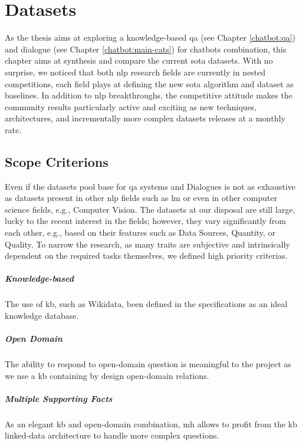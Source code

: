 \chapter{Datasets}
\label{chap:datasets}

As the thesis aims at exploring a knowledge-based \gls{qa} (see Chapter \ref{chatbot:qa}) and dialogue (see Chapter \ref{chatbot:main-cats}) for chatbots combination, this chapter aims at synthesis and compare the current \gls{sota} datasets. With no surprise, we noticed that both \gls{nlp} research fields are currently in nested competitions, each field plays at defining the new \gls{sota} algorithm and dataset as baselines. In addition to \gls{nlp} breakthroughs, the competitive attitude makes the community results particularly active and exciting as new techniques, architectures, and incrementally more complex datasets releases at a monthly rate.

\section{Scope Criterions}
\label{dataset:criterions}
Even if the datasets pool base for \gls{qa} systems and Dialogues is not as exhaustive as datasets present in other \gls{nlp} fields such as \gls{lm} or even in other computer science fields, e.g., Computer Vision. The datasets at our disposal are still large, lucky to the recent interest in the fields; however, they vary significantly from each other, e.g., based on their features such as Data Sources, Quantity, or Quality. To narrow the research, as many traits are subjective and intrinsically dependent on the required tasks themselves, we defined high priority criterias.

\paragraph{Knowledge-based}
The use of \gls{kb}, such as Wikidata, been defined in the specifications as an ideal knowledge database. 

\paragraph{Open Domain}
The ability to respond to \gls{open-domain} question is meaningful to the project as we use a \gls{kb} containing by design \gls{open-domain} relations. 

\paragraph{Multiple Supporting Facts}
As an elegant \gls{kb} and \gls{open-domain} combination, \gls{mh} allows to profit from the \gls{kb} linked-data architecture to handle more complex questions.

